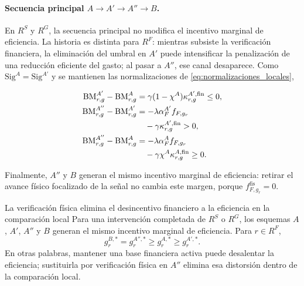 \paragraph{Secuencia principal \(A\to A'\to A''\to B\).}

En \(R^{S}\) y \(R^{G}\), la secuencia principal no modifica el incentivo marginal de eficiencia. La historia es distinta para \(R^{F}\): mientras subsiste la verificación financiera, la eliminación del umbral en \(A'\) puede intensificar la penalización de una reducción eficiente del gasto; al pasar a \(A''\), ese canal desaparece. Como \(\mathrm{Sig}^A=\mathrm{Sig}^{A'}\) y se mantienen las normalizaciones de \eqref{eq:normalizaciones_locales},

\begin{subequations}
\label{eq:diferencias_eficiencia_secuencia}
\begin{align}
\mathrm{BM}_{r,g}^{A'}
-
\mathrm{BM}_{r,g}^{A}
&=
\gamma
(1-\chi^A)
\kappa_{r,g}^{A',\mathrm{fin}}
\leq
0,
\label{eq:diferencia_eficiencia_a_ap}
\\
\mathrm{BM}_{r,g}^{A''}
-
\mathrm{BM}_{r,g}^{A'}
&=
-\lambda
\alpha_F^{A'}
f_{F,g_r}
\notag\\
&\quad
-
\gamma
\kappa_{r,g}^{A',\mathrm{fin}}
>
0,
\label{eq:diferencia_eficiencia_ap_app}
\\
\mathrm{BM}_{r,g}^{A''}
-
\mathrm{BM}_{r,g}^{A}
&=
-\lambda
\alpha_F^{A}
f_{F,g_r}
\notag\\
&\quad
-
\gamma
\chi^A
\kappa_{r,g}^{A,\mathrm{fin}}
\geq
0.
\label{eq:diferencia_eficiencia_a_app}
\end{align}
\end{subequations}

Finalmente, \(A''\) y \(B\) generan el mismo incentivo marginal de eficiencia: retirar el avance físico focalizado de la señal no cambia este margen, porque \(f_{F,g_r}^{\mathrm{fis}}=0\).

\begin{resultadobox}
{La verificación física elimina el desincentivo financiero a la eficiencia en la comparación local}
\label{res:eficiencia_secuencia_principal}
Para una intervención completada de \(R^{S}\) o \(R^{G}\), los esquemas \(A\), \(A'\), \(A''\) y \(B\) generan el mismo incentivo marginal de eficiencia. Para \(r\in R^{F}\),
\begin{equation}
g_r^{B,*}
=
g_r^{A'',*}
\geq
g_r^{A,*}
\geq
g_r^{A',*}.
\end{equation}
En otras palabras, mantener una base financiera activa puede desalentar la eficiencia; sustituirla por verificación física en \(A''\) elimina esa distorsión dentro de la comparación local.
\end{resultadobox}

